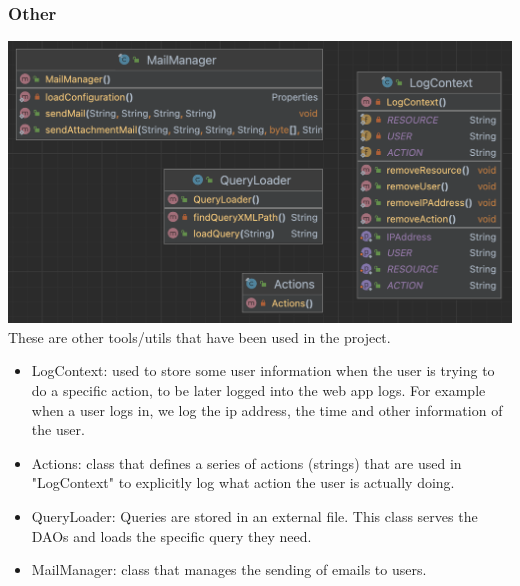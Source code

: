 \subsubsection{Other}

\includegraphics[width=\textwidth]{images/other.png}
These are other tools/utils that have been used in the project.
\begin{itemize}
    \item LogContext: used to store some user information when the user is trying to do a specific action, to be later logged into the web app logs. For example when a user logs in, we log the ip address, the time and other information of the user.
    \item Actions: class that defines a series of actions (strings) that are used in "LogContext" to explicitly log what action the user is actually doing.
    \item QueryLoader: Queries are stored in an external file. This class serves the DAOs and loads the specific query they need.
    \item MailManager: class that manages the sending of emails to users.

\end{itemize}